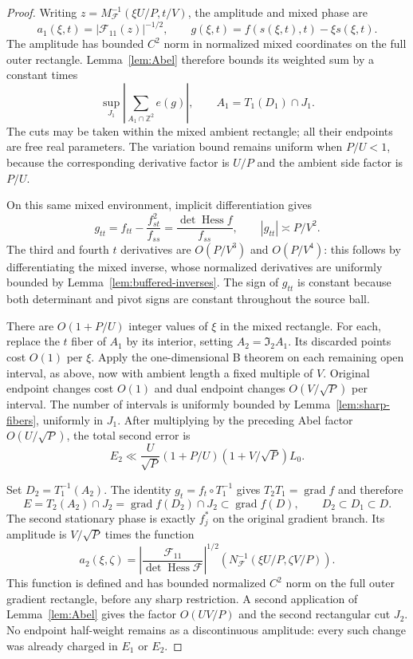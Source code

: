 \documentclass[11pt,a4paper]{article}
\numberwithin{equation}{section}
\theoremstyle{remark}
\newcommand{\Z}{\mathbb Z}
\DeclareMathOperator{\Hess}{Hess}
\DeclareMathOperator{\grad}{grad}
\begin{document}
\begin{proof}
Writing $z=M_{\mathcal F}^{-1}(\xi U/P,t/V)$, the amplitude and mixed
phase are
\[
 a_1(\xi,t)=|\mathcal F_{11}(z)|^{-1/2},\qquad
 g(\xi,t)=f(s(\xi,t),t)-\xi s(\xi,t).
\]
The amplitude has bounded $C^2$ norm in normalized mixed coordinates on
the full outer rectangle. Lemma~\ref{lem:Abel} therefore bounds its
weighted sum by a constant times
\[
 \sup_{J_1}\left|\sum_{A_1\cap\Z^2}e(g)\right|,
 \qquad A_1=T_1(D_1)\cap J_1.
\]
The cuts may be taken within the mixed ambient rectangle; all their
endpoints are free real parameters. The variation bound remains uniform
when $P/U<1$, because the corresponding derivative factor is $U/P$ and
the ambient side factor is $P/U$.

On this same mixed environment, implicit differentiation gives
\begin{equation}\label{eq:mixed-curvature}
 g_{tt}=f_{tt}-\frac{f_{st}^2}{f_{ss}}
       =\frac{\det\Hess f}{f_{ss}},\qquad
 |g_{tt}|\asymp P/V^2.
\end{equation}
The third and fourth $t$ derivatives are $O(P/V^3)$ and $O(P/V^4)$:
this follows by differentiating the mixed inverse, whose normalized
derivatives are uniformly bounded by Lemma~\ref{lem:buffered-inverses}.
The sign of $g_{tt}$ is constant because both determinant and pivot signs
are constant throughout the source ball.

There are $O(1+P/U)$ integer values of $\xi$ in the mixed rectangle.
For each, replace the $t$ fiber of $A_1$ by its interior, setting
$A_2=\mathfrak I_2A_1$. Its discarded points cost $O(1)$ per $\xi$.
Apply the one-dimensional B theorem on each remaining open interval,
as above, now with ambient length a fixed multiple of $V$. Original
endpoint changes cost $O(1)$ and dual endpoint changes $O(V/\sqrt P)$
per interval. The number of intervals is uniformly bounded by
Lemma~\ref{lem:sharp-fibers}, uniformly in $J_1$. After multiplying by
the preceding Abel factor $O(U/\sqrt P)$, the total second error is
\begin{equation}\label{eq:E2}
 E_2\ll\frac U{\sqrt P}(1+P/U)(1+V/\sqrt P)L_0.
\end{equation}

Set $D_2=T_1^{-1}(A_2)$. The identity $g_t=f_t\circ T_1^{-1}$ gives
$T_2T_1=\grad f$ and therefore
\begin{equation}\label{eq:domain-provenance}
 E=T_2(A_2)\cap J_2=\grad f(D_2)\cap J_2
   \subset\grad f(D),\qquad D_2\subset D_1\subset D.
\end{equation}
The second stationary phase is exactly $f_j^*$ on the original gradient
branch. Its amplitude is $V/\sqrt P$ times the function
\[
 a_2(\xi,\zeta)
 =\left|\frac{\mathcal F_{11}}{\det\Hess\mathcal F}\right|^{1/2}
   \!\left(N_{\mathcal F}^{-1}(\xi U/P,\zeta V/P)\right).
\]
This function is defined and has bounded normalized $C^2$ norm on the
full outer gradient rectangle, before any sharp restriction. A second
application of Lemma~\ref{lem:Abel} gives the factor $O(UV/P)$ and the
second rectangular cut $J_2$. No endpoint half-weight remains as a
discontinuous amplitude: every such change was already charged in
$E_1$ or $E_2$.


\end{proof}
\end{document}

